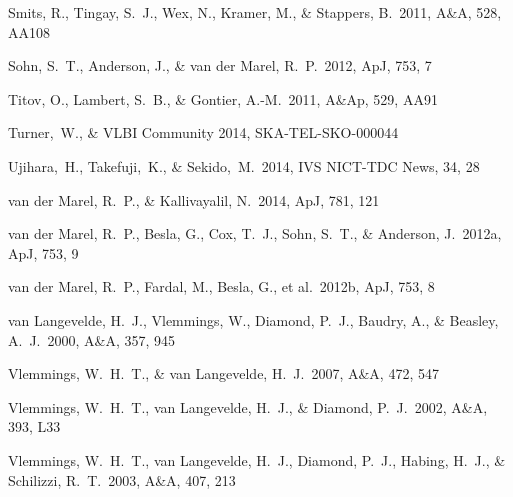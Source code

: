 \begin{thebibliography}{99}
\begin{multicols}{2}
{
Smits, R., Tingay, S.~J., Wex, N., Kramer, M., \& Stappers, B.\ 2011, A\&A, 528, AA108 

 Sohn, S.~T., Anderson, J., \& van der Marel, R.~P.\ 2012, ApJ, 753, 7 

 Titov, O., Lambert, S.~B., \& Gontier, A.-M.\ 2011, A\&Ap, 529, AA91 

 Turner,~W., \& VLBI Community 2014, SKA-TEL-SKO-000044

Ujihara,~H., Takefuji,~K., \& Sekido,~M.\ 2014, IVS NICT-TDC News, 34, 28

 van der Marel, R.~P., \& Kallivayalil, N.\ 2014, ApJ, 781, 121 

 van der Marel, R.~P., Besla, G., Cox, T.~J., Sohn, S.~T., 
\& Anderson, J.\ 2012a, ApJ, 753, 9 

 van der Marel, R.~P., Fardal, M., Besla, G., et al.\ 2012b, ApJ, 753, 8 

van Langevelde, H.~J., Vlemmings, W., Diamond, P.~J., Baudry, A., \& Beasley, A.~J.\ 2000, A\&A, 357, 945 

Vlemmings, W.~H.~T., \& van Langevelde, H.~J.\ 2007, A\&A, 472, 547 

Vlemmings, W.~H.~T., van Langevelde, H.~J., \& Diamond, P.~J.\ 2002, A\&A, 393, L33 

Vlemmings, W.~H.~T., van Langevelde, H.~J., Diamond, P.~J., Habing, H.~J., \& Schilizzi, R.~T.\ 2003, A\&A, 407, 213 







}\end{multicols}
\end{thebibliography}

